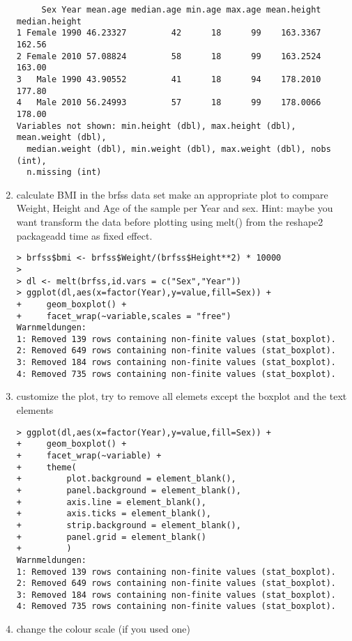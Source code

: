 \begin{frame}
\begin{enumerate}
\begin{verbatim}
     Sex Year mean.age median.age min.age max.age mean.height median.height
1 Female 1990 46.23327         42      18      99    163.3367        162.56
2 Female 2010 57.08824         58      18      99    163.2524        163.00
3   Male 1990 43.90552         41      18      94    178.2010        177.80
4   Male 2010 56.24993         57      18      99    178.0066        178.00
Variables not shown: min.height (dbl), max.height (dbl), mean.weight (dbl),
  median.weight (dbl), min.weight (dbl), max.weight (dbl), nobs (int),
  n.missing (int)
\end{verbatim}
\normalsize
  \item calculate BMI in the brfss data set make an appropriate plot to compare Weight, Height and Age of the sample per Year and sex. Hint: maybe you want transform the data before plotting using melt() from the reshape2 packageadd time as fixed effect.
\scriptsize
\begin{verbatim}
> brfss$bmi <- brfss$Weight/(brfss$Height**2) * 10000
> 
> dl <- melt(brfss,id.vars = c("Sex","Year"))
> ggplot(dl,aes(x=factor(Year),y=value,fill=Sex)) +
+     geom_boxplot() +
+     facet_wrap(~variable,scales = "free")
Warnmeldungen:
1: Removed 139 rows containing non-finite values (stat_boxplot). 
2: Removed 649 rows containing non-finite values (stat_boxplot). 
3: Removed 184 rows containing non-finite values (stat_boxplot). 
4: Removed 735 rows containing non-finite values (stat_boxplot).   
\end{verbatim}
  \item customize the plot, try to remove all elemets except the boxplot and the text elements\scriptsize
\begin{verbatim}
> ggplot(dl,aes(x=factor(Year),y=value,fill=Sex)) +
+     geom_boxplot() +
+     facet_wrap(~variable) +
+     theme(
+         plot.background = element_blank(),
+         panel.background = element_blank(),
+         axis.line = element_blank(),
+         axis.ticks = element_blank(),
+         strip.background = element_blank(),
+         panel.grid = element_blank()
+         )
Warnmeldungen:
1: Removed 139 rows containing non-finite values (stat_boxplot). 
2: Removed 649 rows containing non-finite values (stat_boxplot). 
3: Removed 184 rows containing non-finite values (stat_boxplot). 
4: Removed 735 rows containing non-finite values (stat_boxplot).   
\end{verbatim}
\normalsize
  \item change the colour scale (if you used one)\scriptsize
\begin{verbatim}

\end{verbatim}
\end{enumerate}
\end{frame}
